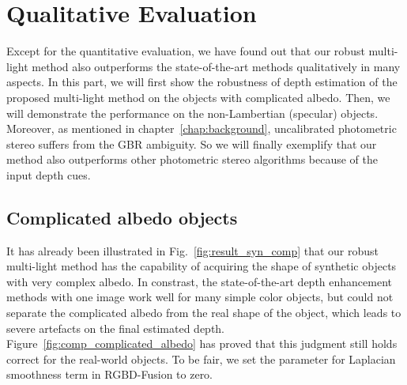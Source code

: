 \section{Qualitative Evaluation}
Except for the quantitative evaluation, we have found out that our robust multi-light method also outperforms the state-of-the-art methods qualitatively in many aspects.
In this part, we will first show the robustness of depth estimation of the proposed multi-light method on the objects with complicated albedo.
Then, we will demonstrate the performance on the non-Lambertian (specular) objects.
Moreover, as mentioned in chapter~\ref{chap:background}, uncalibrated photometric stereo suffers from the GBR ambiguity.
So we will finally exemplify that our method also outperforms other photometric stereo algorithms because of the input depth cues.

\subsection{Complicated albedo objects}
It has already been illustrated in Fig.~\ref{fig:result_syn_comp} that our robust multi-light method has the capability of acquiring the shape of synthetic objects with very complex albedo.
In constrast, the state-of-the-art depth enhancement methods with one image work well for many simple color objects, but could not separate the complicated albedo from the real shape of the object, which leads to severe artefacts on the final estimated depth. 
Figure~\ref{fig:comp_complicated_albedo} has proved that this judgment still holds correct for the real-world objects.
To be fair, we set the parameter for Laplacian smoothness term in RGBD-Fusion to zero.

